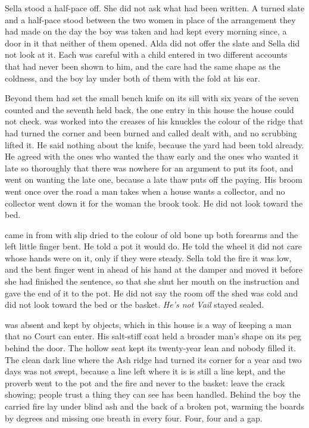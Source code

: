 Sella stood a half-pace off. She did not ask what had been written. A turned slate and a half-pace stood between the two women in place of the arrangement they had made on the day the boy was taken and had kept every morning since, a door in it that neither of them opened. Alda did not offer the slate and Sella did not look at it. Each was careful with a child entered in two different accounts that had never been shown to him, and the care had the same shape as the coldness, and the boy lay under both of them with the fold at his ear.

\scenebreak

Beyond them  had set the small bench knife on its sill with six years of the seven counted and the seventh held back, the one entry in this house the house could not check.  was worked into the creases of his knuckles the colour of the ridge that had turned the corner and been burned and called dealt with, and no scrubbing lifted it. He said nothing about the knife, because the yard had been told already. He agreed with the ones who wanted the thaw early and the ones who wanted it late so thoroughly that there was nowhere for an argument to put its foot, and went on wanting the late one, because a late thaw puts off the paying. His broom went once over the road a man takes when a house wants a collector, and no collector went down it for the woman the brook took. He did not look toward the bed.

 came in from  with slip dried to the colour of old bone up both forearms and the left little finger bent. He told a pot it would do. He told the wheel it did not care whose hands were on it, only if they were steady. Sella told the fire it was low, and the bent finger went in ahead of his hand at the damper and moved it before she had finished the sentence, so that she shut her mouth on the instruction and gave the end of it to the pot. He did not say the room off the shed was cold and did not look toward the bed or the basket. \emph{He's not Vail} stayed sealed.

 was absent and kept by objects, which in this house is a way of keeping a man that no Court can enter. His salt-stiff coat held a broader man's shape on its peg behind the door. The hollow seat kept its twenty-year lean and nobody filled it. The clean dark line where the Ash ridge had turned its corner for a year and two days was not swept, because a line left where it is is still a line kept, and the proverb went to the pot and the fire and never to the basket: leave the crack showing; people trust a thing they can see has been handled. Behind the boy the carried fire lay under blind ash and the back of a broken pot, warming the boards by degrees and missing one breath in every four. Four, four and a gap.

